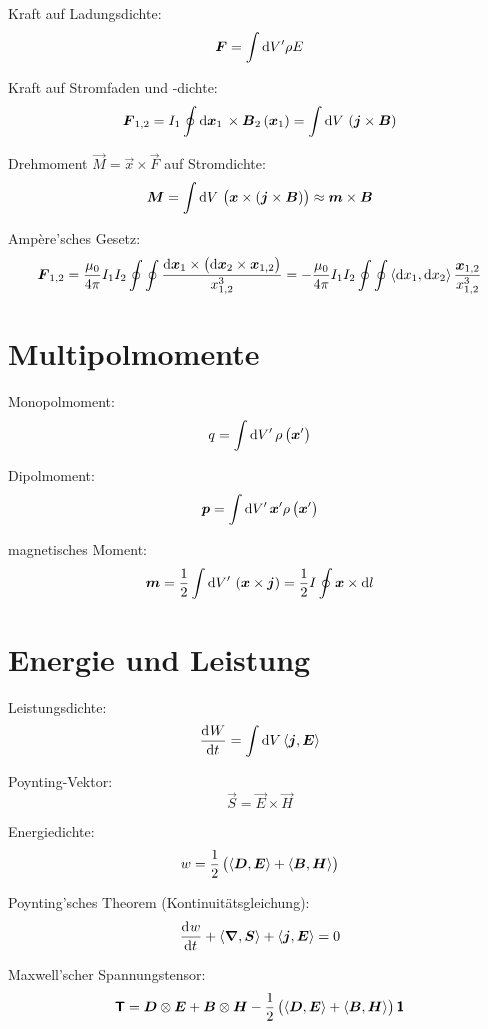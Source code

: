 Kraft auf Ladungsdichte:
\[
	\vec F
	= \int \dif{V'} \rho E
\]

Kraft auf Stromfaden und -dichte:
\[
	\vec F_{1,2}
	= I_1 \oint \dif{\vec x_1} \, \times \vec B_2\del{\vec x_1}
	= \int \dif{V} \, \del{\vec j \times \vec B}
\]

Drehmoment $\vec M = \vec x \times \vec F$ auf Stromdichte:
\[
	\vec M
	= \int \dif{V} \, \del{\vec x \times \del{\vec j \times \vec B}}
	\approx \vec m \times \vec B
\]

Ampère'sches Gesetz:
\[
	\vec F_{1,2}
	= \frac{\mu_0}{4 \pi} I_1 I_2 \oint \oint \frac{\dif \vec x_1 \times \del{\dif \vec x_2 \times \vec x_{1,2}}}{x_{1,2}^3}
	= - \frac{\mu_0}{4 \pi} I_1 I_2 \oint \oint \inner{\dif x_1}{\dif x_2} \frac{\vec x_{1,2}}{x_{1,2}^3}
\]

\section{Multipolmomente}

Monopolmoment:
\[
	q
	= \int \dif{V'} \, \rho\del{\vec x'}
\]

Dipolmoment:
\[
	\vec p
	= \int \dif{V'} \, \vec x' \rho\del{\vec x'}
\]

magnetisches Moment:
\[
	\vec m
	= \half \int \dif{V'} \, \del{\vec x \times \vec j}
	= \half I \oint \vec x \times \dif l
\]

\section{Energie und Leistung}

Leistungsdichte:
\[
	\dod Wt = \int \dif V \inner{\vec j}{\vec E}
\]

Poynting-Vektor:
\[
	\vec S = \vec E \times \vec H
\]

Energiedichte:
\[
	w = \half \del{\inner{\vec D}{\vec E} + \inner{\vec B}{\vec H}}
\]

Poynting'sches Theorem (Kontinuitätsgleichung):
\[
	\dod wt + \divergence{\vec S} + \inner{\vec j}{\vec E} = 0
\]

Maxwell'scher Spannungstensor:
\[
	\tens T
	= \vec D \otimes \vec E + \vec B \otimes \vec H
	- \half \del{\inner{\vec D}{\vec E} + \inner{\vec B}{\vec H}} \tens 1
\]


%	
%	



